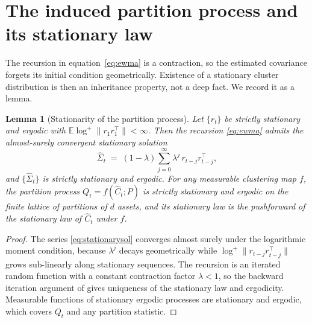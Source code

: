\documentclass[11pt]{article}
\newtheorem{lemma}{Lemma}
\theoremstyle{remark}
\newcommand{\E}{\mathbb{E}}
\begin{document}
\section{The induced partition process and its stationary law}

The recursion in equation~\eqref{eq:ewma} is a contraction, so the estimated
covariance forgets its initial condition geometrically. Existence of a
stationary cluster distribution is then an inheritance property, not a deep
fact. We record it as a lemma.

\begin{lemma}[Stationarity of the partition process]
\label{lem:stationarity}
Let $\{r_t\}$ be strictly stationary and ergodic with
$\E \log^{+} \| r_1 r_1^{\top} \| < \infty$. Then the recursion
\eqref{eq:ewma} admits the almost-surely convergent stationary solution
\begin{equation}
\widehat{\Sigma}_t \;=\; (1-\lambda) \sum_{j=0}^{\infty} \lambda^{j}\,
r_{t-j} r_{t-j}^{\top},
\label{eq:stationarysol}
\end{equation}
and $\{\widehat{\Sigma}_t\}$ is strictly stationary and ergodic. For any
measurable clustering map $f$, the partition process
$Q_t = f(\widehat{C}_t; P)$ is strictly stationary and ergodic on the finite
lattice of partitions of $d$ assets, and its stationary law is the pushforward
of the stationary law of $\widehat{C}_t$ under $f$.
\end{lemma}

\begin{proof}
The series \eqref{eq:stationarysol} converges almost surely under the
logarithmic moment condition, because $\lambda^j$ decays geometrically while
$\log^{+}\|r_{t-j} r_{t-j}^{\top}\|$ grows sub-linearly along stationary
sequences. The recursion is an iterated random function with a constant
contraction factor $\lambda < 1$, so the backward iteration argument of
\citet{diaconis1999iterated} gives uniqueness of the stationary law and
ergodicity. Measurable functions of stationary ergodic processes are stationary
and ergodic, which covers $Q_t$ and any partition statistic.
\end{proof}
\end{document}
